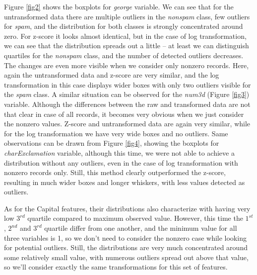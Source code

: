 \documentclass{article}\usepackage[]{graphicx}\usepackage[]{xcolor}
\begin{document}
Figure \ref{fig2} shows the boxplots for \textit{george} variable. We can see that for the untransformed
data there are multiple outliers in the \textit{nonspam} class, few outliers for \textit{spam}, and
the distribution for both classes is strongly concentrated around zero. For z-score it looks almost
identical, but in the case of log transformation, we can see that the distribution spreads 
out a little -- at least we can distinguish quartiles for the \textit{nonspam} class, and the number
of detected outliers decreases. The changes are even more visible when we consider only nonzero records.
Here, again the untransformed data and z-score are very similar, and the log transformation in this case
displays wider boxes with only two outliers visible for the \textit{spam} class.
A similar situation can be observed for the \textit{num3d} (Figure \ref{fig3}) variable. Although the differences
between the raw and transformed data are not that clear in case of all records, 
it becomes very obvious when we just consider the nonzero values. Z-score and untransformed data
are again very similar, while for the log transformation we have very wide boxes and no 
outliers. Same observations can be drawn from Figure \ref{fig4}, showing the boxplots
for \textit{charExclamation} variable, although this time, we were not able to achieve a distribution without any outliers,
even in the case of log transformation with nonzero records only. Still, this method
clearly outperformed the z-score, resulting in much wider boxes and longer whiskers,
with less values detected as outliers.

As for the Capital features, their distributions also characterize with having
very low $3^{rd}$ quartile compared to maximum observed value. However, this time 
the $1^{st}$, $2^{nd}$ and $3^{rd}$ quartile differ from one another, and the
minimum value for all three variables is 1, so we don't need to consider the nonzero
case while looking for potential outliers. Still, the distributions are very much concentrated
around some relatively small value, with numerous outliers spread out above that value,
so we'll consider exactly the same transformations for this set of features.
\end{document}
